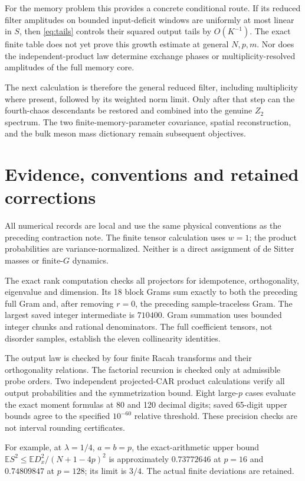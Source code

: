 \documentclass[11pt,a4paper]{article}
\newcommand{\EE}{\mathbb E}
\begin{document}
For the memory problem this provides a concrete conditional route.
If its reduced filter amplitudes on bounded input-deficit windows
are uniformly at most linear in $S$, then \eqref{eq:tails} controls
their squared output tails by $O(K^{-1})$. The exact finite table
does not yet prove this growth estimate at general $N,p,m$.
Nor does the independent-product law determine exchange phases
or multiplicity-resolved amplitudes of the full memory core.

The next calculation is therefore the general reduced filter,
including multiplicity where present, followed by its weighted
norm limit. Only after that step can the fourth-chaos descendants
be restored and combined into the genuine $Z_2$ spectrum. The
two finite-memory-parameter covariance, spatial reconstruction,
and the bulk meson mass dictionary remain subsequent objectives.

\newpage
\section{Evidence, conventions and retained corrections}
All numerical records are local and use the same physical conventions
as the preceding contraction note. The finite tensor calculation uses
$w=1$; the product probabilities are variance-normalized. Neither is
a direct assignment of de Sitter masses or finite-$G$ dynamics.

The exact rank computation checks all projectors for idempotence,
orthogonality, eigenvalue and dimension. Its 18 block Grams sum
exactly to both the preceding full Gram and, after removing $r=0$,
the preceding sample-traceless Gram. The largest saved integer
intermediate is $710400$. Gram summation uses bounded integer
chunks and rational denominators. The full coefficient tensors,
not disorder samples, establish the eleven collinearity identities.

The output law is checked by four finite Racah transforms and
their orthogonality relations. The factorial recursion is checked
only at admissible probe orders. Two independent projected-CAR
product calculations verify all output probabilities and the
symmetrization bound. Eight large-$p$ cases evaluate the exact
moment formulas at 80 and 120 decimal digits; saved 65-digit
upper bounds agree to the specified $10^{-60}$ relative threshold.
These precision checks are not interval rounding certificates.

For example, at $\lambda=1/4$, $a=b=p$, the exact-arithmetic upper
bound $\EE S^2\le\EE D_x^2/(N+1-4p)^2$ is approximately
$0.73772646$ at $p=16$ and $0.74809847$ at $p=128$; its limit
is $3/4$. The actual finite deviations are retained.
\end{document}
